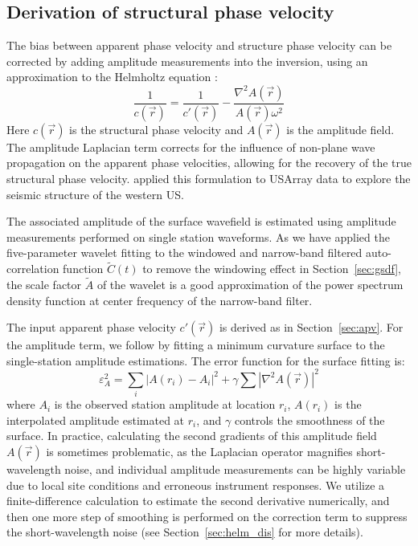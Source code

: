 \subsection{Derivation of structural phase velocity}
\label{sec:ampcor}

The bias between apparent phase velocity and structure phase velocity can be corrected by adding amplitude measurements into the inversion, using an approximation to the Helmholtz equation \citep{Wielandt:1993ws,Lin:2011fw}:
\begin{equation}
	\frac{1}{c(\vec{r})} = \frac{1}{c'(\vec{r})} - 
	\frac{ \nabla^2 A(\vec{r})}{A(\vec{r}) \omega^2}
\end{equation}
Here $c(\vec{r})$ is the structural phase velocity and $A(\vec{r})$ is the amplitude field. The amplitude Laplacian term corrects for the influence of non-plane wave propagation on the apparent phase velocities, allowing for the recovery of the true structural phase velocity. \citet{Lin:2011fw} applied this formulation to USArray data to explore the seismic structure of the western US.

The associated amplitude of the surface wavefield is estimated using amplitude measurements performed on single station waveforms. As we have applied the five-parameter wavelet fitting to the windowed and narrow-band filtered auto-correlation function $\tilde{C}(t)$ to remove the windowing effect in Section~\ref{sec:gsdf}, the scale factor $\tilde{A}$ of the wavelet is a good approximation of the power spectrum density function at center frequency of the narrow-band filter.

The input apparent phase velocity $c'(\vec{r})$ is derived as in Section~\ref{sec:apv}.  For the amplitude term, we follow \citet{Lin:2011fw} by fitting a minimum curvature surface to the single-station amplitude estimations. The error function for the surface fitting is:
\begin{equation}
	\varepsilon_{A}^2 = \sum_i\left|A(r_i)-A_i\right|^2 + \gamma\sum |\nabla^2 A(\vec{r})|^2 
\end{equation}
where $A_i$ is the observed station amplitude at location $r_i$, $A(r_i)$ is the interpolated amplitude estimated at $r_i$, and $\gamma$ controls the smoothness of the surface. In practice, calculating the second gradients of this amplitude field $A(\vec{r})$ is sometimes problematic, as the Laplacian operator magnifies short-wavelength noise, and individual amplitude measurements can be highly variable due to local site conditions and erroneous instrument responses. We utilize a finite-difference calculation to estimate the second derivative numerically, and then one more step of smoothing is performed on the correction term to suppress the short-wavelength noise (see Section~\ref{sec:helm_dis} for more details).

